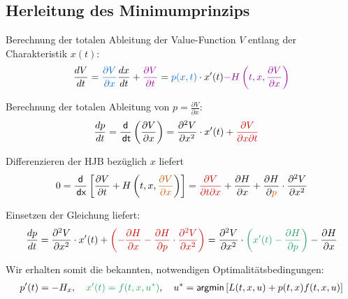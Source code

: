 \documentclass[a4paper, 12pt]{scrartcl}
\newcommand{\rot}[2][rot]{\textcolor{#1}{#2}}
\newcommand{\gruen}[2][cadGreen]{\textcolor{#1}{#2}}
\newcommand{\orange}[2][orange]{\textcolor{#1}{#2}}
\newcommand{\blau}[2][blau]{\textcolor{#1}{#2}}
\newcommand{\lila}[2][lila]{\textcolor{#1}{#2}}
\newcommand{\dx}{\thinspace \mathsf{dx}}
\newcommand{\dt}{\thinspace \mathsf{dt}}
\begin{document}
\subsection{Herleitung des Minimumprinzips}

Berechnung der totalen Ableitung der Value-Function $V$ entlang der Charakteristik $x(t)$:
%
\begin{align*}
    \frac{dV}{dt} &= \blau{\frac{\partial V}{\partial x}} \frac{dx}{dt} + \lila{\frac{\partial V}{\partial t}} = \blau{p(x,t)} \cdot x'(t) \lila{- H\left( t,x , \frac{\partial V}{\partial x} \right)} \\
\end{align*}

Berechnung der totalen Ableitung von $p = \frac{\partial V}{\partial x}$:
%
\begin{align*}
\frac{dp}{dt} &= \frac{\mathsf{d}}{\dt} \left( \frac{\partial V}{\partial x} \right) =  \frac{\partial^2 V}{\partial x^2} \cdot x'(t) + \rot{\frac{\partial V}{\partial x \partial t}}
\end{align*}

Differenzieren der HJB bezüglich $x$ liefert
%
\begin{align*}
0 = \frac{\mathsf{d}}{\dx} \left[ \frac{\partial V}{\partial t} + H\left(t,x, \orange{ \frac{\partial V}{\partial x}} \right) \right] = \rot{\frac{\partial V}{\partial t \partial x}} + \frac{\partial H}{\partial x} + \frac{\partial H}{\partial \orange{p}} \cdot \frac{\partial^2 V}{\partial x^2}
\end{align*}

Einsetzen der Gleichung liefert:
%
\begin{align*}
    \frac{dp}{dt} 
    =  
    \frac{\partial^2 V}{\partial x^2} \cdot x'(t) 
    + 
    \rot{
        \left(
            - \frac{\partial H}{\partial x} 
            - \frac{\partial H}{\partial p} 
            \cdot 
            \frac{\partial^2 V}{\partial x^2} 
        \right)
        }
    = 
    \frac{\partial^2 V}{\partial x^2} \cdot 
    \gruen{
        \left(
            x'(t) - \frac{\partial H}{\partial p} 
        \right)
        } 
        - \frac{\partial H}{\partial x}
\end{align*}

Wir erhalten somit die bekannten, notwendigen Optimalitätsbedingungen:
%
\begin{align*}
p'(t) = -H_x , \quad \gruen{x'(t) = f(t,x,u^*)}, \quad u^* = \textsf{argmin} \left[ L(t,x,u)+ p(t,x)f(t,x,u) \right]
\end{align*}
\end{document}
